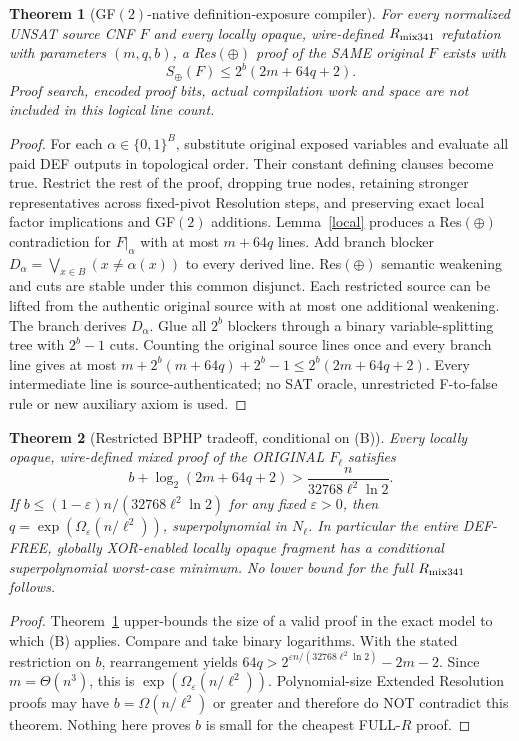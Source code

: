 \documentclass[11pt]{article}
\newtheorem{theorem}{Theorem}
\begin{document}
\begin{theorem}[GF$(2)$-native definition-exposure compiler]\label{compiler}
For every normalized UNSAT source CNF $F$ and every locally opaque, wire-defined $R_{\rm mix341}$ refutation with parameters $(m,q,b)$, a Res$(\oplus)$ proof of the SAME original $F$ exists with
\[
\boxed{S_\oplus(F)\le 2^b(2m+64q+2).} \tag{1}
\]
Proof search, encoded proof bits, actual compilation work and space are not included in this logical line count.
\end{theorem}
\begin{proof}
For each $\alpha\in\{0,1\}^B$, substitute original exposed variables and evaluate all paid DEF outputs in topological order. Their constant defining clauses become true. Restrict the rest of the proof, dropping true nodes, retaining stronger representatives across fixed-pivot Resolution steps, and preserving exact local factor implications and GF$(2)$ additions. Lemma~\ref{local} produces a Res$(\oplus)$ contradiction for $F|_\alpha$ with at most $m+64q$ lines. Add branch blocker $D_\alpha=\bigvee_{x\in B}(x\ne\alpha(x))$ to every derived line. Res$(\oplus)$ semantic weakening and cuts are stable under this common disjunct. Each restricted source can be lifted from the authentic original source with at most one additional weakening. The branch derives $D_\alpha$. Glue all $2^b$ blockers through a binary variable-splitting tree with $2^b-1$ cuts. Counting the original source lines once and every branch line gives at most $m+2^b(m+64q)+2^b-1\le2^b(2m+64q+2)$. Every intermediate line is source-authenticated; no SAT oracle, unrestricted F-to-false rule or new auxiliary axiom is used.
\end{proof}

\begin{theorem}[Restricted BPHP tradeoff, conditional on (B)]\label{tradeoff}
Every locally opaque, wire-defined mixed proof of the ORIGINAL $F_\ell$ satisfies
\[
\boxed{b+\log_2(2m+64q+2)>
\frac{n}{32768\ell^2\ln2}.} \tag{2}
\]
If $b\le(1-\varepsilon)n/(32768\ell^2\ln2)$ for any fixed $\varepsilon>0$, then $q=\exp(\Omega_\varepsilon(n/\ell^2))$, superpolynomial in $N_\ell$. In particular the entire DEF-FREE, globally XOR-enabled locally opaque fragment has a conditional superpolynomial worst-case minimum. No lower bound for the full $R_{\rm mix341}$ follows.
\end{theorem}
\begin{proof}
Theorem~\ref{compiler} upper-bounds the size of a valid proof in the exact model to which (B) applies. Compare and take binary logarithms. With the stated restriction on $b$, rearrangement yields $64q>2^{\varepsilon n/(32768\ell^2\ln2)}-2m-2$. Since $m=\Theta(n^3)$, this is $\exp(\Omega_\varepsilon(n/\ell^2))$. Polynomial-size Extended Resolution proofs may have $b=\Omega(n/\ell^2)$ or greater and therefore do NOT contradict this theorem. Nothing here proves $b$ is small for the cheapest FULL-$R$ proof.
\end{proof}
\end{document}
